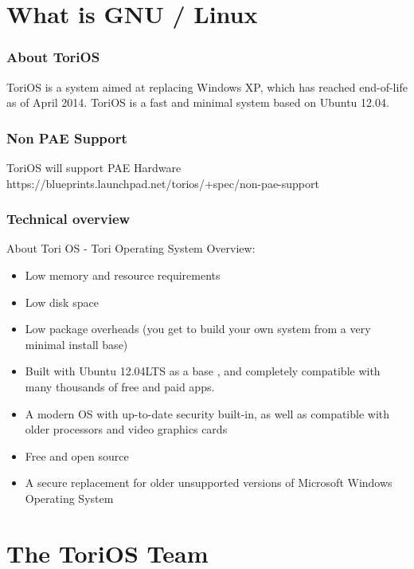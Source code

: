 \documentclass[12pt,a4paper]{book}
\begin{document}
\chapter{What is GNU / Linux}


\subsection{About ToriOS}

ToriOS is a system aimed at replacing Windows XP, which has reached end-of-life as of April 2014. ToriOS is a fast and minimal system based on Ubuntu 12.04. 
\subsection{Non PAE Support}

ToriOS will support PAE Hardware\\
https://blueprints.launchpad.net/torios/+spec/non-pae-support

\newpage 
\subsection{Technical overview}

About Tori OS - Tori Operating System Overview:

\begin{itemize}
\item{Low memory and resource requirements}
\item{Low disk space}
\item{Low package overheads (you get to build your own system from a very minimal install base)}
\item{Built with Ubuntu 12.04LTS as a base , and completely compatible with many thousands of free and paid apps.}
\item{ A modern OS with up-to-date security built-in, as well as compatible with older processors and video graphics cards}
\item{Free and open source}
\item{A secure replacement for older unsupported versions of Microsoft Windows Operating System} 
\end{itemize}


\chapter{The ToriOS Team}
\end{document}
